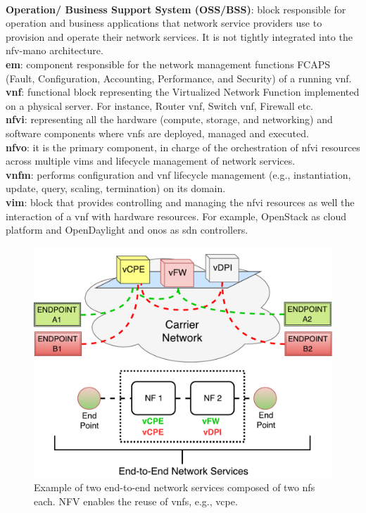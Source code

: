  \\
 \noindent \textbf{Operation/ Business Support System (OSS/BSS)}: block responsible for operation and business applications that network service providers use to provision and operate their network services. It is not tightly integrated into the \gls{nfv}-\gls{mano} architecture.
 \\
\noindent \textbf{\gls{em}}: component responsible for the network management functions FCAPS (Fault, Configuration, Accounting, Performance, and Security) of a running \gls{vnf}.
\\
\noindent\textbf{\gls{vnf}}: functional block representing the Virtualized Network Function implemented on a physical server. For instance, Router \gls{vnf}, Switch \gls{vnf}, Firewall etc.
\\
\noindent \textbf{\gls{nfvi}}: representing all the hardware (compute, storage, and networking) and software components where \glspl{vnf} are deployed, managed and executed. 
\\
\noindent \textbf{\gls{nfvo}}: it is the primary component, in charge of the orchestration of \gls{nfvi} resources across multiple \glspl{vim} and lifecycle management of network services. 
\\
\noindent\textbf{\gls{vnfm}}: performs configuration and \gls{vnf} lifecycle management (e.g., instantiation, update, query, scaling, termination) on its domain.
\\
\noindent \textbf{\gls{vim}}: block that provides controlling and managing the \gls{nfvi} resources as well the interaction of a \gls{vnf} with hardware resources. For example, OpenStack as cloud platform and OpenDaylight and \gls{onos} as \gls{sdn} controllers.
 

\begin{figure}[t]
  \centering
  \includegraphics[scale=.46]{Figures/02_Background/fig5.pdf}
    \caption{Example of two end-to-end network services composed of two \glspl{nf} each. NFV enables the reuse of \glspl{vnf}, e.g., \gls{vcpe}.}
    \label{nffg}
\end{figure}

